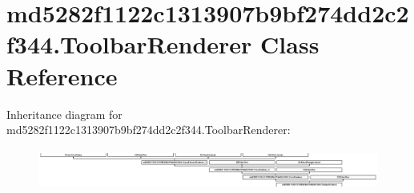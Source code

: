 \hypertarget{classmd5282f1122c1313907b9bf274dd2c2f344_1_1ToolbarRenderer}{}\section{md5282f1122c1313907b9bf274dd2c2f344.\+Toolbar\+Renderer Class Reference}
\label{classmd5282f1122c1313907b9bf274dd2c2f344_1_1ToolbarRenderer}
Inheritance diagram for md5282f1122c1313907b9bf274dd2c2f344.\+Toolbar\+Renderer\+:\begin{figure}[H]
\begin{center}
\leavevmode
\includegraphics[height=1.372549cm]{classmd5282f1122c1313907b9bf274dd2c2f344_1_1ToolbarRenderer}
\end{center}
\end{figure}
